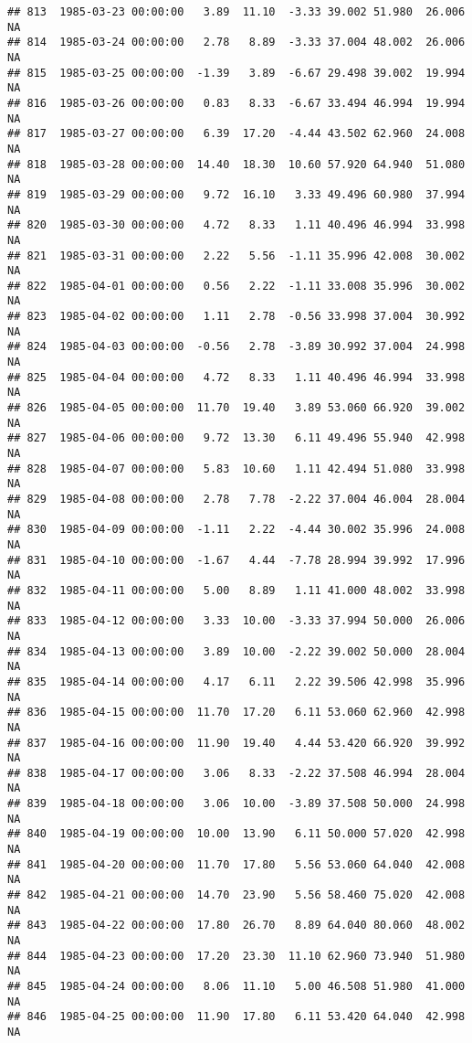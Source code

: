 \documentclass{article}\usepackage{graphicx, color}
\makeatletter
\newenvironment{kframe}{%
 \def\at@end@of@kframe{}%
 \ifinner\ifhmode%
  \def\at@end@of@kframe{\end{minipage}}%
  \begin{minipage}{\columnwidth}%
 \fi\fi%
 \def\FrameCommand##1{\hskip\@totalleftmargin \hskip-\fboxsep
 \colorbox{shadecolor}{##1}\hskip-\fboxsep
     \hskip-\linewidth \hskip-\@totalleftmargin \hskip\columnwidth}%
 \MakeFramed {\advance\hsize-\width
   \@totalleftmargin\z@ \linewidth\hsize
   \@setminipage}}%
 {\par\unskip\endMakeFramed%
 \at@end@of@kframe}
\newenvironment{knitrout}{}{} %
\makeatother
\begin{document}
\begin{knitrout}
\begin{kframe}
\begin{verbatim}
## 813  1985-03-23 00:00:00   3.89  11.10  -3.33 39.002 51.980  26.006     NA
## 814  1985-03-24 00:00:00   2.78   8.89  -3.33 37.004 48.002  26.006     NA
## 815  1985-03-25 00:00:00  -1.39   3.89  -6.67 29.498 39.002  19.994     NA
## 816  1985-03-26 00:00:00   0.83   8.33  -6.67 33.494 46.994  19.994     NA
## 817  1985-03-27 00:00:00   6.39  17.20  -4.44 43.502 62.960  24.008     NA
## 818  1985-03-28 00:00:00  14.40  18.30  10.60 57.920 64.940  51.080     NA
## 819  1985-03-29 00:00:00   9.72  16.10   3.33 49.496 60.980  37.994     NA
## 820  1985-03-30 00:00:00   4.72   8.33   1.11 40.496 46.994  33.998     NA
## 821  1985-03-31 00:00:00   2.22   5.56  -1.11 35.996 42.008  30.002     NA
## 822  1985-04-01 00:00:00   0.56   2.22  -1.11 33.008 35.996  30.002     NA
## 823  1985-04-02 00:00:00   1.11   2.78  -0.56 33.998 37.004  30.992     NA
## 824  1985-04-03 00:00:00  -0.56   2.78  -3.89 30.992 37.004  24.998     NA
## 825  1985-04-04 00:00:00   4.72   8.33   1.11 40.496 46.994  33.998     NA
## 826  1985-04-05 00:00:00  11.70  19.40   3.89 53.060 66.920  39.002     NA
## 827  1985-04-06 00:00:00   9.72  13.30   6.11 49.496 55.940  42.998     NA
## 828  1985-04-07 00:00:00   5.83  10.60   1.11 42.494 51.080  33.998     NA
## 829  1985-04-08 00:00:00   2.78   7.78  -2.22 37.004 46.004  28.004     NA
## 830  1985-04-09 00:00:00  -1.11   2.22  -4.44 30.002 35.996  24.008     NA
## 831  1985-04-10 00:00:00  -1.67   4.44  -7.78 28.994 39.992  17.996     NA
## 832  1985-04-11 00:00:00   5.00   8.89   1.11 41.000 48.002  33.998     NA
## 833  1985-04-12 00:00:00   3.33  10.00  -3.33 37.994 50.000  26.006     NA
## 834  1985-04-13 00:00:00   3.89  10.00  -2.22 39.002 50.000  28.004     NA
## 835  1985-04-14 00:00:00   4.17   6.11   2.22 39.506 42.998  35.996     NA
## 836  1985-04-15 00:00:00  11.70  17.20   6.11 53.060 62.960  42.998     NA
## 837  1985-04-16 00:00:00  11.90  19.40   4.44 53.420 66.920  39.992     NA
## 838  1985-04-17 00:00:00   3.06   8.33  -2.22 37.508 46.994  28.004     NA
## 839  1985-04-18 00:00:00   3.06  10.00  -3.89 37.508 50.000  24.998     NA
## 840  1985-04-19 00:00:00  10.00  13.90   6.11 50.000 57.020  42.998     NA
## 841  1985-04-20 00:00:00  11.70  17.80   5.56 53.060 64.040  42.008     NA
## 842  1985-04-21 00:00:00  14.70  23.90   5.56 58.460 75.020  42.008     NA
## 843  1985-04-22 00:00:00  17.80  26.70   8.89 64.040 80.060  48.002     NA
## 844  1985-04-23 00:00:00  17.20  23.30  11.10 62.960 73.940  51.980     NA
## 845  1985-04-24 00:00:00   8.06  11.10   5.00 46.508 51.980  41.000     NA
## 846  1985-04-25 00:00:00  11.90  17.80   6.11 53.420 64.040  42.998     NA

\end{verbatim}
\end{kframe}
\end{knitrout}
\end{document}

